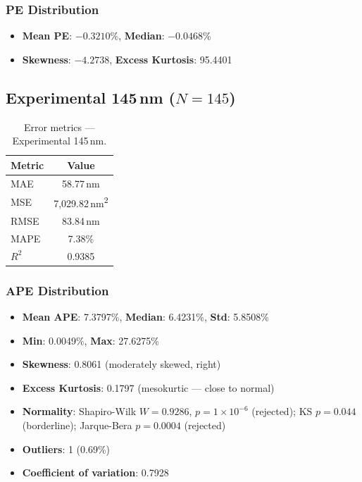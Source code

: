 \documentclass[11pt,a4paper]{article}
\begin{document}
\subsubsection{PE Distribution}

\begin{itemize}
  \item \textbf{Mean PE}: $-0.3210$\%, \textbf{Median}: $-0.0468$\%
  \item \textbf{Skewness}: $-4.2738$, \textbf{Excess Kurtosis}: 95.4401
\end{itemize}

\subsection{Experimental 145\,nm ($N = 145$)}

\begin{table}[H]
\centering
\caption{Error metrics — Experimental 145\,nm.}
\label{tab:metrics_145}
\begin{tabular}{lc}
\toprule
\textbf{Metric} & \textbf{Value} \\
\midrule
MAE                 & 58.77\,nm \\
MSE                 & 7,029.82\,nm\textsuperscript{2} \\
RMSE                & 83.84\,nm \\
MAPE                & 7.38\% \\
$R^2$               & 0.9385 \\
\bottomrule
\end{tabular}
\end{table}

\subsubsection{APE Distribution}

\begin{itemize}
  \item \textbf{Mean APE}: 7.3797\%, \textbf{Median}: 6.4231\%, \textbf{Std}: 5.8508\%
  \item \textbf{Min}: 0.0049\%, \textbf{Max}: 27.6275\%
  \item \textbf{Skewness}: 0.8061 (moderately skewed, right)
  \item \textbf{Excess Kurtosis}: 0.1797 (mesokurtic — close to normal)
  \item \textbf{Normality}: Shapiro-Wilk $W = 0.9286$, $p = 1 \times 10^{-6}$ (rejected); KS $p = 0.044$ (borderline); Jarque-Bera $p = 0.0004$ (rejected)
  \item \textbf{Outliers}: 1 (0.69\%)
  \item \textbf{Coefficient of variation}: 0.7928
\end{itemize}
\end{document}
